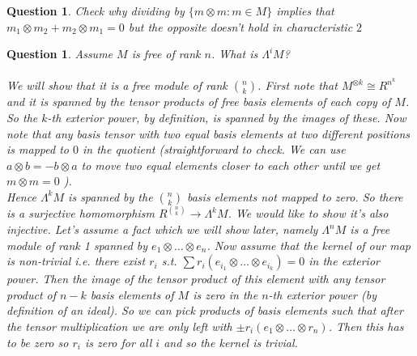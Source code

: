 \documentclass[a4paper]{article}
\newtheorem{que}[thm]{Question}
\begin{document}
\begin{que} Check why dividing by $\{m \otimes m : m \in M\}$ implies that $m_1 \otimes m_2 + m_2 \otimes m_1 = 0$ but the opposite doesn't hold in characteristic $2$
\end{que}
\begin{que} Assume $M$ is free of rank $n$. What is $\Lambda^i M$?\\\\
    We will show that it is a free module of rank $\binom{n}{k}$. First note that $M^{\otimes k}\cong R^{n^{k}}$ and it is spanned by the tensor products of free basis elements of each copy of $M$. So the $k$-th exterior power, by definition, is spanned by the images of these. Now note that any basis tensor with two equal basis elements at two different positions is mapped to $0$ in the quotient (straightforward to check. We can use $a\otimes b=-b\otimes a$ to move two equal elements closer to each other until we get $m\otimes m=0$ ).\\
    Hence $\Lambda^{k}M$ is spanned by the $\binom{n}{k}$ basis elements not mapped to zero. So there is a surjective homomorphism $R^{\binom{n}{k}}\to \Lambda^{k}M$. We would like to show it's also injective. Let's assume a fact which we will show later, namely $\Lambda^{n}M$ is a free module of rank 1 spanned by $e_1\otimes \ldots\otimes e_n$. Now assume that the kernel of our map is non-trivial i.e. there exist $r_i$ s.t. $\sum r_i (e_{i_1}\otimes \ldots\otimes e_{i_k})=0$ in the exterior power. Then the image of the tensor product of this element with any tensor product of $n-k$ basis elements of $M$ is zero in the  $n$-th exterior power (by definition of an ideal). So we can pick products of basis elements such that after the tensor multiplication we are only left with  $\pm r_i \left( e_1 \otimes \ldots \otimes r_n \right) $. Then this has to be zero so $r_i$ is zero for all $i$ and so the kernel is trivial.\\

\end{que}
\end{document}
